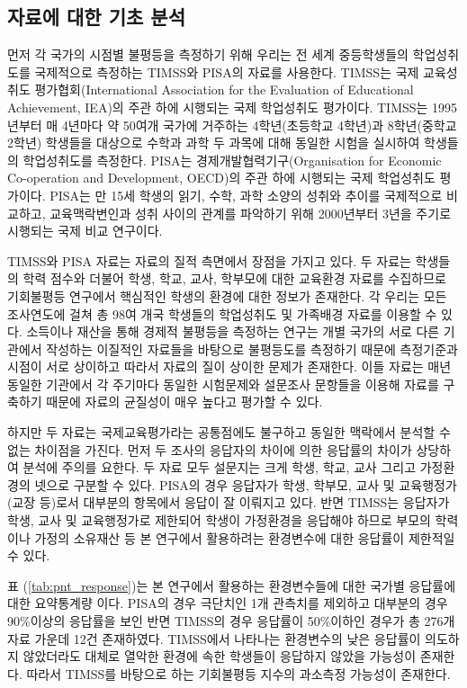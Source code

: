 \subsection{자료에 대한 기초 분석}

먼저 각 국가의 시점별 불평등을 측정하기 위해 우리는 전 세계 중등학생들의 학업성취도를 국제적으로 측정하는 TIMSS와 PISA의 자료를 사용한다.
TIMSS는 국제 교육성취도 평가협회(International Association for the Evaluation of Educational Achievement, IEA)의 주관 하에 시행되는 국제 학업성취도 평가이다.
TIMSS는 1995년부터 매 4년마다 약 50여개 국가에 거주하는 4학년(초등학교 4학년)과 8학년(중학교 2학년) 학생들을 대상으로 수학과 과학 두 과목에 대해 동일한 시험을 실시하여 학생들의 학업성취도를 측정한다.
PISA는 경제개발협력기구(Organisation for Economic Co-operation and Development, OECD)의 주관 하에 시행되는 국제 학업성취도 평가이다.
PISA는 만 15세 학생의 읽기, 수학, 과학 소양의 성취와 추이를 국제적으로 비교하고, 교육맥락변인과 성취 사이의 관계를 파악하기 위해 2000년부터 3년을 주기로 시행되는 국제 비교 연구이다.
 
TIMSS와 PISA 자료는 자료의 질적 측면에서 장점을 가지고 있다.
두 자료는 학생들의 학력 점수와 더불어  학생, 학교, 교사, 학부모에 대한 교육환경 자료를 수집하므로 기회불평등 연구에서 핵심적인 학생의 환경에 대한 정보가 존재한다.
각 우리는 모든 조사연도에 걸쳐 총 98여 개국 학생들의 학업성취도 및 가족배경 자료를 이용할 수 있다.
소득이나 재산을 통해 경제적 불평등을 측정하는 연구는 개별 국가의 서로 다른 기관에서 작성하는 이질적인 자료들을 바탕으로 불평등도를 측정하기 때문에 측정기준과 시점이 서로 상이하고 따라서 자료의 질이 상이한 문제가 존재한다.
이들 자료는 매년 동일한 기관에서 각 주기마다 동일한 시험문제와 설문조사 문항들을 이용해 자료를 구축하기 때문에 자료의 균질성이 매우 높다고 평가할 수 있다.

하지만 두 자료는 국제교육평가라는 공통점에도 불구하고 동일한 맥락에서 분석할 수 없는 차이점을 가진다.
먼저 두 조사의 응답자의 차이에 의한 응답률의 차이가 상당하여 분석에 주의를 요한다. 두 자료 모두 설문지는 크게 학생, 학교, 교사 그리고 가정환경의 넷으로 구분할 수 있다. PISA의 경우 응답자가 학생, 학부모, 교사 및 교육행정가(교장 등)로서 대부분의 항목에서 응답이 잘 이뤄지고 있다. 반면 TIMSS는 응답자가 학생, 교사 및 교육행정가로 제한되어 학생이 가정환경을 응답해야 하므로 부모의 학력이나 가정의 소유재산 등 본 연구에서 활용하려는 환경변수에 대한 응답률이 제한적일 수 있다.



표 (\ref{tab:pnt_response})는 본 연구에서 활용하는 환경변수들에 대한 국가별 응답률에 대한 요약통계량 이다. PISA의 경우 극단치인 1개 관측치를 제외하고 대부분의 경우 90\%이상의 응답률을 보인 반면 TIMSS의 경우 응답률이 50\%이하인 경우가 총 276개 자료 가운데 12건 존재하였다. 
TIMSS에서 나타나는 환경변수의 낮은 응답률이 의도하지 않았더라도 대체로 열악한 환경에 속한 학생들이 응답하지 않았을 가능성이 존재한다.
따라서 TIMSS를 바탕으로 하는 기회불평등 지수의 과소측정 가능성이 존재한다.

